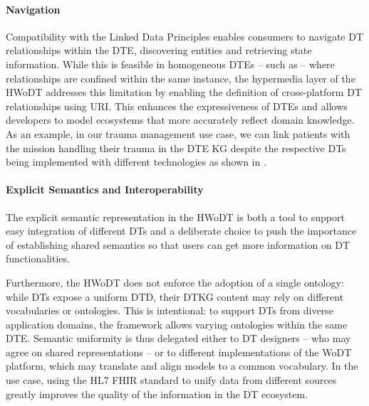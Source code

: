 \paragraph{Navigation}
Compatibility with the Linked Data Principles enables consumers to navigate \ac{DT} relationships within the \ac{DTE}, discovering entities and retrieving state information.
%
While this is feasible in homogeneous \acp{DTE} -- such as \azureTwin{} -- where relationships are confined within the same instance, the hypermedia layer of the \ac{HWoDT} addresses this limitation by enabling the definition of cross-platform \ac{DT} relationships using \ac{URI}.   
This enhances the expressiveness of \acp{DTE} and allows developers to model ecosystems that more accurately reflect domain knowledge.
%
As an example, in our trauma management use case, we can link patients with the mission handling their trauma in the \ac{DTE} \ac{KG} despite the respective \acp{DT} being implemented with different technologies as shown in .


%     

\paragraph{Explicit Semantics and Interoperability}

The explicit semantic representation in the \ac{HWoDT} is both a tool to support easy integration of different \acp{DT} and a deliberate choice to push the importance of establishing shared semantics so that users can get more information on \ac{DT} functionalities.

Furthermore, the \ac{HWoDT} does not enforce the adoption of a single ontology: while \acp{DT} expose a uniform \ac{DTD}, their \ac{DTKG} content may rely on different vocabularies or ontologies.
This is intentional: to support \acp{DT} from diverse application domains, the framework allows varying ontologies within the same \ac{DTE}.  
Semantic uniformity is thus delegated either to \ac{DT} designers -- who may agree on shared representations -- or to different implementations of the \ac{WoDT} platform, which may translate and align models to a common vocabulary. 
%
In the use case, using the HL7 FHIR standard to unify data from different sources greatly improves the quality of the information in the \ac{DT} ecosystem.

